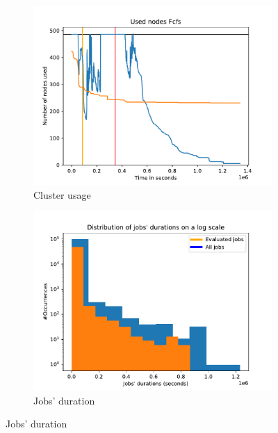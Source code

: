 \documentclass[a4paper]{article}
\begin{document}
\begin{figure}[H]\centering
\begin{subfigure}[b]{0.4\linewidth}\centering\includegraphics[width=1\linewidth]{MBSS/plot/2022-01-17->2022-01-19_Fcfs_Used_nodes_450_128_32_256_4_1024.pdf}\caption{Cluster usage}\label{37}\end{subfigure}
\begin{subfigure}[b]{0.4\linewidth}\centering\includegraphics[width=1\linewidth]{MBSS/plot/Distribution/2022-01-17->2022-01-19_delay.pdf}\caption{Jobs' duration}\label{38}\end{subfigure}

\end{figure}
\end{document}
